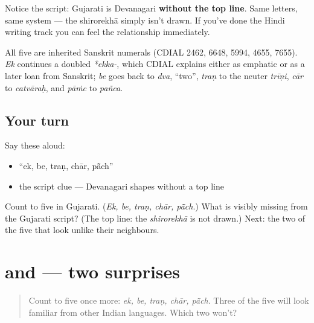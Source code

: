 Notice the script: Gujarati is Devanagari \textbf{without the top line}. Same letters, same system — the shirorekhā simply isn't drawn. If you've done the Hindi writing track you can feel the relationship immediately.

\begin{cousinweb}
All five are inherited Sanskrit numerals (CDIAL 2462, 6648, 5994, 4655, 7655). \emph{Ek} continues a doubled \emph{*ekka-}, which CDIAL explains either as emphatic or as a later loan from Sanskrit; \emph{be} goes back to \emph{dva}, \textquotedblleft{}two\textquotedblright{}, \emph{traṇ} to the neuter \emph{trīṇi}, \emph{cār} to \emph{catvāraḥ}, and \emph{pāṁc} to \emph{pañca}.
\end{cousinweb}

\subsection*{Your turn}
Say these aloud:

\begin{itemize}
\raggedright
  \item \textquotedblleft{}ek, be, traṇ, chār, pā̃ch\textquotedblright{}
  \item the script clue — Devanagari shapes without a top line
\end{itemize}

\begin{tcolorbox}[breakable,colback=teal!4,colframe=teal!35!black,title={Before you move on}]
Count to five in Gujarati. (\emph{Ek, be, traṇ, chār, pā̃ch}.) What is visibly missing from the Gujarati script? (The top line: the \emph{shirorekhā} is not drawn.) Next: the two of the five that look unlike their neighbours.
\end{tcolorbox}
\section[\texorpdfstring{(\gu{એક} \gu{બે} \gu{ત્રણ} \gu{ચાર} \gu{પાંચ}, continued)}{(એક બે ત્રણ ચાર પાંચ, continued)}]{ and  — two surprises}

\label{lesson:GU-C06-numbers-1-5-more}



\begin{quote}
Count to five once more: \emph{ek, be, traṇ, chār, pā̃ch}. Three of the five will look familiar from other Indian languages. Which two won't?
\end{quote}

